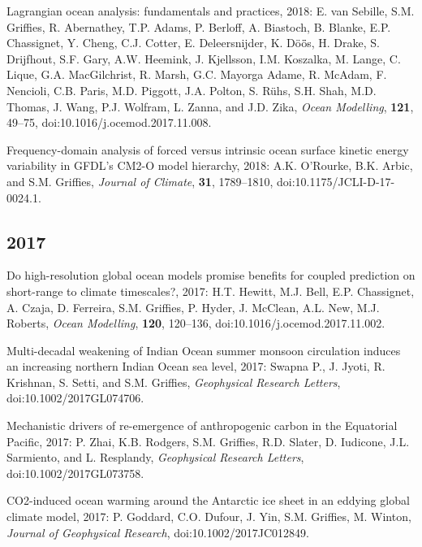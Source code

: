 \begin{etaremune}
\item  Lagrangian ocean analysis: fundamentals and practices, 2018: E. van Sebille, S.M. Grif\/f\/ies, R. Abernathey, T.P. Adams, P. Berloff, A. Biastoch, B. Blanke, E.P. Chassignet, Y. Cheng, C.J. Cotter, E. Deleersnijder, K. {D\"{o}\"{o}̈s}, H. Drake, S. Drijfhout, S.F. Gary, A.W. Heemink, J. Kjellsson, I.M. Koszalka, M. Lange, C. Lique, G.A.  MacGilchrist, R. Marsh, G.C. Mayorga Adame, R. McAdam, F. Nencioli, C.B. Paris, M.D. Piggott, J.A. Polton, S. {R\"{u}hs}, S.H. Shah, M.D. Thomas, J. Wang, P.J. Wolfram, L. Zanna, and J.D. Zika, {\it Ocean Modelling},
{\bf 121}, 49--75,  doi:10.1016/j.ocemod.2017.11.008.

\item Frequency-domain analysis of forced versus intrinsic ocean surface kinetic energy variability in GFDL's CM2-O model hierarchy, 2018: A.K. O'Rourke, B.K. Arbic, and S.M. Grif\/f\/ies, {\it Journal of Climate}, {\bf 31}, 1789--1810, doi:10.1175/JCLI-D-17-0024.1.


\subsection*{\sc \color{Maroon} 2017}


\item Do high-resolution global ocean models promise benefits for coupled prediction on short-range to climate timescales?, 2017: H.T. Hewitt, M.J. Bell, E.P. Chassignet, A. Czaja, D. Ferreira, S.M. Grif\/f\/ies, P. Hyder, J. McClean, A.L. New, M.J. Roberts, {\it Ocean Modelling}, {\bf 120}, 120--136, doi:10.1016/j.ocemod.2017.11.002.

\item Multi-decadal weakening of Indian Ocean summer monsoon circulation induces an increasing northern Indian Ocean sea level, 2017: Swapna P., J. Jyoti, R. Krishnan, S. Setti, and S.M. Grif\/f\/ies, {\it Geophysical Research  Letters}, \newline doi:10.1002/2017GL074706.



\item Mechanistic drivers of re-emergence of anthropogenic carbon in the Equatorial Pacific, 2017: P. Zhai, K.B. Rodgers, S.M. Grif\/fies, R.D. Slater, D. Iudicone, J.L. Sarmiento, and L. Resplandy, {\it Geophysical Research Letters}, doi:10.1002/2017GL073758.

\item CO2-induced ocean warming around the Antarctic ice sheet in an eddying global climate model, 2017: P. Goddard, C.O. Dufour, J. Yin, S.M. Grif\/f\/ies, M. Winton, {\it Journal of Geophysical Research}, doi:10.1002/2017JC012849. 


\end{etaremune}
